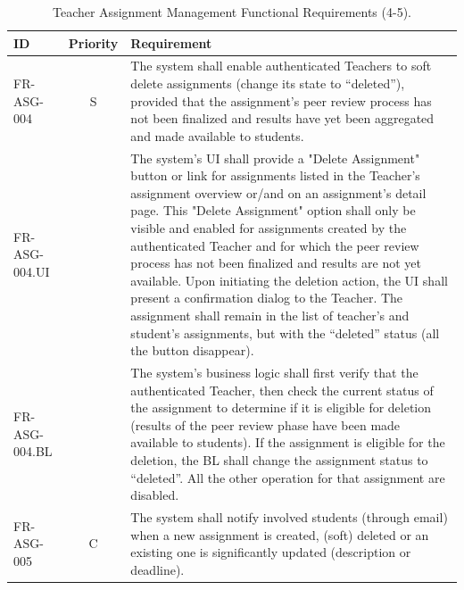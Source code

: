 \vspace*{\fill}
\begin{table}[h]
    \centering
   \begin{tabular}{|l|c|p{10cm}|}
        \hline
        \textbf{ID} & \textbf{Priority} & \textbf{Requirement} \\
        \hline
        FR-ASG-004 & S & The system shall enable authenticated Teachers to soft delete assignments (change its state to “deleted”), provided that the assignment's peer review process has not been finalized and results have yet been aggregated and made available to students. \\
        \quad FR-ASG-004.UI &  & \quad The system's UI shall provide a "Delete Assignment" button or link for assignments listed in the Teacher's assignment overview or/and on an assignment's detail page. This "Delete Assignment" option shall only be visible and enabled for assignments created by the authenticated Teacher and for which the peer review process has not been finalized and results are not yet available. Upon initiating the deletion action, the UI shall present a confirmation dialog to the Teacher. The assignment shall remain in the list of teacher’s and student’s assignments, but with the “deleted” status (all the button disappear). \\
        \quad FR-ASG-004.BL &  & \quad The system's business logic shall first verify that the authenticated Teacher, then check the current status of the assignment to determine if it is eligible for deletion (results of the peer review phase have been made available to students). If the assignment is eligible for the deletion, the BL shall change the assignment status to “deleted”. All the other operation for that assignment are disabled. \\
        \hline
        FR-ASG-005 & C & The system shall notify involved students (through email) when a new assignment is created, (soft) deleted or an existing one is significantly updated (description or deadline). \\
        \hline
    \end{tabular}
    \caption{Teacher Assignment Management Functional Requirements (4-5).}
    \label{tab:AssignmentManagerTeacherFR3}
\end{table}

\vspace*{\fill}

